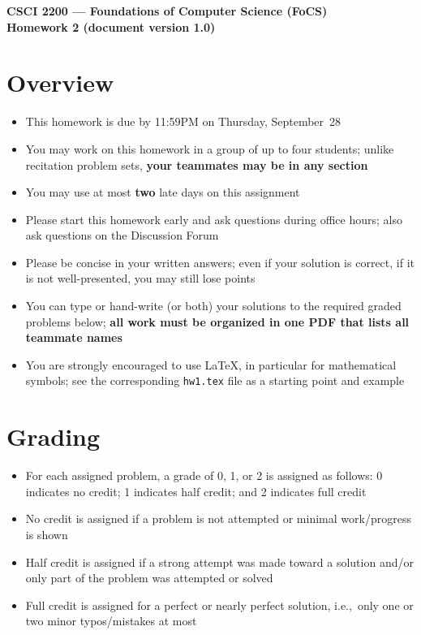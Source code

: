 \documentclass[11pt]{article}
\begin{document}
\thispagestyle{empty}

\begin{center}
\large
\textbf{CSCI 2200 --- Foundations of Computer Science (FoCS) \\
Homework 2 (document version 1.0)}
\end{center}

\section*{Overview}
\begin{itemize}
\item This homework is due by 11:59PM on Thursday, September~28
\item You may work on this homework in a group of up to four students;
  unlike recitation problem sets,
  \textbf{your teammates may be in any section}
\item You may use at most \textbf{two} late days on this assignment
\item Please start this homework early and ask questions during
  office hours; %
  also ask questions on the Discussion Forum
\item Please be concise in your written answers;
  even if your solution is correct, if it is not well-presented,
  you may still lose points
\item You can type or hand-write (or both) your solutions
  to the required graded problems below;
  \textbf{all work must be organized in one PDF that lists
  all teammate names}
\item You are strongly encouraged to use LaTeX, in particular for
  mathematical symbols;
  see the corresponding \verb+hw1.tex+ file as a starting point
  and example
\end{itemize}


\section*{Grading}
\begin{itemize}
\item For each assigned problem, a grade of 0, 1, or 2 is assigned
  as follows:
  0 indicates no credit;
  1 indicates half credit;
  and 2 indicates full credit
\item No credit is assigned if a problem is not attempted
  or minimal work/progress is shown
\item Half credit is assigned if a strong attempt was made
  toward a solution and/or only part of the problem was attempted or solved
\item Full credit is assigned for a perfect or nearly perfect solution,
  i.e.,~only one or two minor typos/mistakes at most
\end{itemize}
\end{document}
